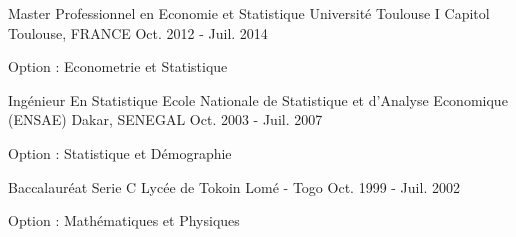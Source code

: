 

\begin{cventries}

  \cventry
    {Master Professionnel en Economie et Statistique} %
    {Université Toulouse I Capitol} %
    {Toulouse, FRANCE} %
    {Oct. 2012 - Juil. 2014} %
    {
      \begin{cvitems} %
        \item {Option : Econometrie et Statistique}
      \end{cvitems}
    }

\end{cventries}

\begin{cventries}

  \cventry
    {Ingénieur En Statistique} %
    {Ecole Nationale de Statistique et d'Analyse Economique (ENSAE)} %
    {Dakar, SENEGAL} %
    {Oct. 2003 - Juil. 2007} %
    {
      \begin{cvitems} %
        \item {Option : Statistique et Démographie}
      \end{cvitems}
    }

\end{cventries}

\begin{cventries}

  \cventry
    {Baccalauréat Serie C} %
    {Lycée de Tokoin} %
    {Lomé - Togo} %
    {Oct. 1999 - Juil. 2002} %
    {
      \begin{cvitems} %
        \item {Option : Mathématiques et Physiques}
      \end{cvitems}
    }

\end{cventries}


